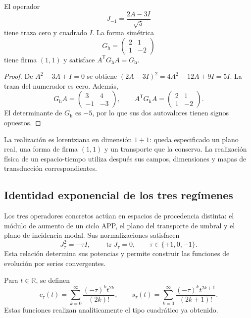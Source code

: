\begin{proposicion}
\label{eul:prop:hiperbolico}
El operador
\[
 J_{-1}=\frac{2A-3I}{\sqrt5}
\]
tiene traza cero y cuadrado \(I\). La forma simétrica
\[
 G_{\mathrm h}=\begin{pmatrix}2&1\\1&-2\end{pmatrix}
\]
tiene firma \((1,1)\) y satisface
\(A^\mathsf TG_{\mathrm h}A=G_{\mathrm h}\).
\end{proposicion}
\begin{proof}
De \(A^2-3A+I=0\) se obtiene
\((2A-3I)^2=4A^2-12A+9I=5I\). La traza del numerador es cero.
Además,
\[
 G_{\mathrm h}A=\begin{pmatrix}3&4\\-1&-3\end{pmatrix},
 \qquad
 A^\mathsf TG_{\mathrm h}A
 =\begin{pmatrix}2&1\\1&-2\end{pmatrix}.
\]
El determinante de \(G_{\mathrm h}\) es \(-5\), por lo que sus dos
autovalores tienen signos opuestos.
\end{proof}

La realización es lorentziana en dimensión \(1+1\): queda especificado
un plano real, una forma de firma \((1,1)\) y un transporte que la
conserva. La realización física de un espacio-tiempo utiliza después
sus campos, dimensiones y mapas de transducción correspondientes.

\subsection{Identidad exponencial de los tres regímenes}
\label{eul:identidad}

Los tres operadores concretos actúan en espacios de procedencia distinta:
el módulo de aumento de un ciclo APP, el plano del transporte de umbral
y el plano de incidencia modal. Sus normalizaciones satisfacen
\[
 J_\tau^2=-\tau I,\qquad \operatorname{tr}J_\tau=0,
 \qquad \tau\in\{+1,0,-1\}.
\]
Esta relación determina sus potencias y permite construir las funciones
de evolución por series convergentes.

\begin{definicion}
Para \(t\in\mathbb R\), se definen
\[
 c_\tau(t)=\sum_{k=0}^{\infty}
       \frac{(-\tau)^kt^{2k}}{(2k)!},\qquad
 s_\tau(t)=\sum_{k=0}^{\infty}
       \frac{(-\tau)^kt^{2k+1}}{(2k+1)!}.
\]
Estas funciones realizan analíticamente el tipo cuadrático ya obtenido.
\end{definicion}

